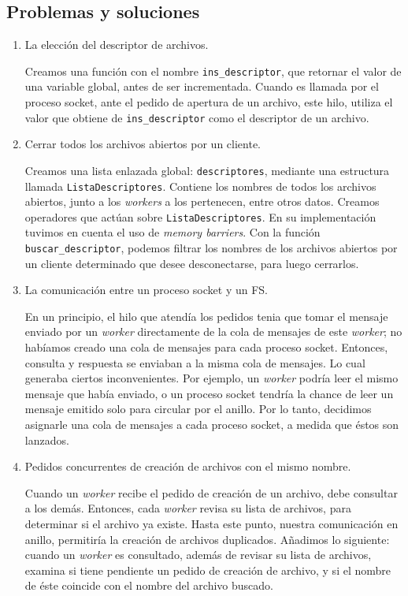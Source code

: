 \documentclass[a4paper, 8pt]{article}
\begin{document}
\subsection{Problemas y soluciones}
  \begin{enumerate}
    \item La elección del descriptor de archivos.
    
    Creamos una función con el nombre \texttt{ins\_descriptor}, que retornar el valor de una variable global, antes de ser incrementada.
    Cuando es llamada por el proceso socket, ante el pedido de apertura de un archivo, este hilo, utiliza el valor que obtiene de \texttt{ins\_descriptor} como el
    descriptor de un archivo.
    
    \item Cerrar todos los archivos abiertos por un cliente.
    
    Creamos una lista enlazada global: \texttt{descriptores}, mediante una estructura llamada \texttt{ListaDescriptores}. Contiene los nombres de todos los archivos abiertos, junto a los \textit{workers} a los pertenecen, entre otros datos.
    Creamos operadores que actúan sobre \texttt{ListaDescriptores}.
    En su implementación tuvimos en cuenta el uso de \textit{memory barriers}.
    Con la función \texttt{buscar\_descriptor}, podemos filtrar los nombres de los archivos abiertos por un cliente determinado que desee desconectarse, para luego cerrarlos.
    
    \item La comunicación entre un proceso socket y un FS.
    
    En un principio, el hilo que atendía los pedidos tenia que tomar el mensaje enviado por un \textit{worker} directamente de la cola de mensajes de este \textit{worker};
    no habíamos creado una cola de mensajes para cada proceso socket. 
    Entonces, consulta y respuesta se enviaban a la misma cola de mensajes. Lo cual generaba ciertos inconvenientes. Por ejemplo,
    un \textit{worker} podría leer el mismo mensaje que había enviado, o un proceso socket tendría la chance de
    leer un mensaje emitido solo para circular por el anillo.
    Por lo tanto, decidimos asignarle una cola de mensajes a cada proceso socket, a medida que éstos son lanzados.
    
    \item Pedidos concurrentes de creación de archivos con el mismo nombre.
    
    Cuando un \textit{worker} recibe el pedido de creación de un archivo, debe consultar a los demás. Entonces, cada \textit{worker} revisa su lista de archivos, para
    determinar si el archivo ya existe. Hasta este punto, nuestra comunicación en anillo, permitiría la creación de archivos duplicados.
    Añadimos lo siguiente:
    cuando un \textit{worker} es consultado, además de revisar su lista de archivos, examina si tiene pendiente un pedido de creación de archivo,
    y si el nombre de éste coincide con el nombre del archivo buscado.
    

\end{enumerate}
\end{document}
